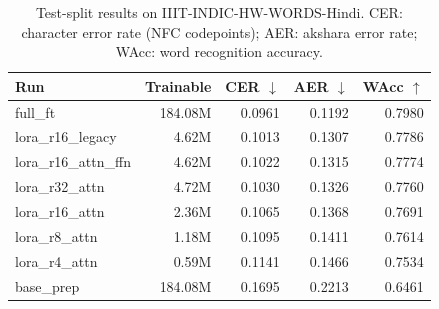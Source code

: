 \begin{table}[t]
  \centering
  \caption{Test-split results on IIIT-INDIC-HW-WORDS-Hindi. CER: character error rate (NFC codepoints); AER: akshara error rate; WAcc: word recognition accuracy.}
  \label{tab:main}
  \begin{tabular}{lrrrr}
    \toprule
    Run & Trainable & CER $\downarrow$ & AER $\downarrow$ & WAcc $\uparrow$ \\
    \midrule
    full\_ft & 184.08M & 0.0961 & 0.1192 & 0.7980 \\
    lora\_r16\_legacy & 4.62M & 0.1013 & 0.1307 & 0.7786 \\
    lora\_r16\_attn\_ffn & 4.62M & 0.1022 & 0.1315 & 0.7774 \\
    lora\_r32\_attn & 4.72M & 0.1030 & 0.1326 & 0.7760 \\
    lora\_r16\_attn & 2.36M & 0.1065 & 0.1368 & 0.7691 \\
    lora\_r8\_attn & 1.18M & 0.1095 & 0.1411 & 0.7614 \\
    lora\_r4\_attn & 0.59M & 0.1141 & 0.1466 & 0.7534 \\
    base\_prep & 184.08M & 0.1695 & 0.2213 & 0.6461 \\
    \bottomrule
  \end{tabular}
\end{table}
